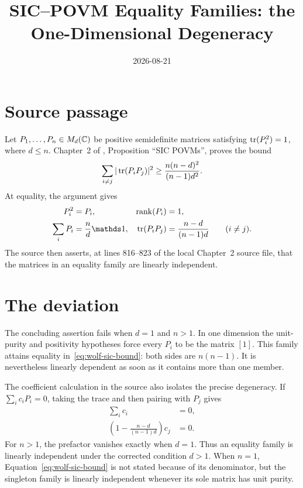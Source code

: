 \documentclass{article}
\title{SIC--POVM Equality Families: the One-Dimensional Degeneracy}
\author{}
\date{2026-08-21}
\begin{document}
\maketitle
{}

\section{Source passage}

Let $P_1,\ldots,P_n\in M_{d}(\mathbb{C})$ be positive semidefinite matrices satisfying
$\operatorname{tr}(P_i^2)=1$, where $d\le n$. Chapter~2 of
\cite{Wolf2012Quantum}, Proposition ``SIC POVMs'', proves the bound
\begin{align}
  \sum_{i\ne j}|\operatorname{tr}(P_iP_j)|^2
  \ge \frac{n(n-d)^2}{(n-1)d^2}.
  \label{eq:wolf-sic-bound}
\end{align}
At equality, the argument gives
\begin{align}
  P_i^2&=P_i, & \operatorname{rank}(P_i)&=1, \\
  \sum_iP_i&=\frac nd\Id, &
  \tr(P_iP_j)&=\frac{n-d}{(n-1)d}\qquad(i\ne j).
  \label{eq:wolf-sic-equality}
\end{align}
The source then asserts, at lines 816--823 of the local Chapter~2 source file,
that the matrices in an equality family are linearly independent.

\section{The deviation}

The concluding assertion fails when $d=1$ and $n>1$. In one dimension the
unit-purity and positivity hypotheses force every $P_i$ to be the matrix
$[1]$. This family attains equality in~\eqref{eq:wolf-sic-bound}: both sides
are $n(n-1)$. It is nevertheless linearly dependent as soon as it contains
more than one member.

The coefficient calculation in the source also isolates the precise
degeneracy. If $\sum_i c_iP_i=0$, taking the trace and then pairing with
$P_j$ gives
\begin{align}
  \sum_i c_i&=0, \\
  \left(1-\frac{n-d}{(n-1)d}\right)c_j&=0.
\end{align}
For $n>1$, the prefactor vanishes exactly when $d=1$. Thus an equality family
is linearly independent under the corrected condition $d>1$. When $n=1$,
Equation~\eqref{eq:wolf-sic-bound} is not stated because of its denominator,
but the singleton family is linearly independent whenever its sole matrix has
unit purity.
\end{document}
